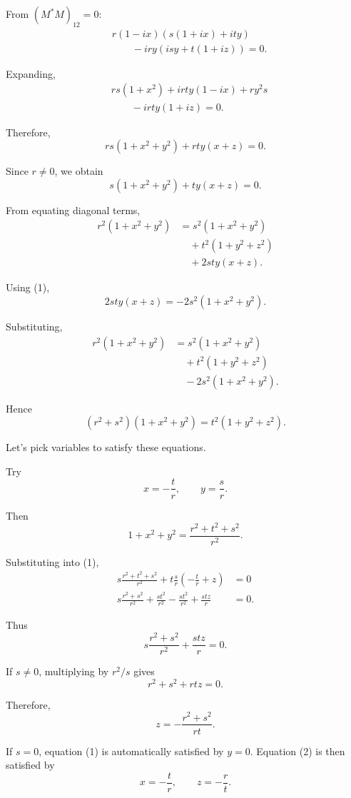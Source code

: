 \documentclass[11pt, reqno, a4paper]{amsart}
\theoremstyle{plain}
\theoremstyle{definition}
\theoremstyle{remark}
\numberwithin{equation}{section}
\begin{document}
From $(M^*M)_{12}=0$:
\begin{align*}
&r(1-ix)(s(1+ix)+ity)\\
&\qquad -iry(isy+t(1+iz))=0.
\end{align*}

Expanding,
\begin{align*}
&rs(1+x^2)+irty(1-ix)+ry^2s\\
&\qquad -irty(1+iz)=0.
\end{align*}

Therefore,
\[
rs(1+x^2+y^2)+rty(x+z)=0.
\]

Since $r\neq0$, we obtain
\[
\boxed{
s(1+x^2+y^2)+ty(x+z)=0.
\tag{1}
}
\]

From equating diagonal terms,
\begin{align*}
r^2(1+x^2+y^2)
&=
s^2(1+x^2+y^2)\\
&\quad+t^2(1+y^2+z^2)\\
&\quad+2sty(x+z).
\end{align*}

Using (1),
\[
2sty(x+z)=-2s^2(1+x^2+y^2).
\]

Substituting,
\begin{align*}
r^2(1+x^2+y^2)
&=
s^2(1+x^2+y^2)\\
&\quad+t^2(1+y^2+z^2)\\
&\quad-2s^2(1+x^2+y^2).
\end{align*}

Hence
\[
\boxed{
(r^2+s^2)(1+x^2+y^2)
=
t^2(1+y^2+z^2).
\tag{2}
}
\]

Let's pick variables to satisfy these equations.

Try
\[
x=-\frac{t}{r},
\qquad
y=\frac{s}{r}.
\]

Then
\[
1+x^2+y^2
=
\frac{r^2+t^2+s^2}{r^2}.
\]

Substituting into (1),
\begin{align*}
s\frac{r^2+t^2+s^2}{r^2}
+
t\frac{s}{r}
\left(-\frac{t}{r}+z\right)
&=0\\
s\frac{r^2+s^2}{r^2}
+
\frac{st^2}{r^2}
-
\frac{st^2}{r^2}
+
\frac{stz}{r}
&=0.
\end{align*}

Thus
\[
s\frac{r^2+s^2}{r^2}
+
\frac{stz}{r}=0.
\]

If $s\neq0$, multiplying by $r^2/s$ gives
\[
r^2+s^2+rtz=0.
\]

Therefore,
\[
\boxed{
z=-\frac{r^2+s^2}{rt}.
}
\]

If $s=0$, equation (1) is automatically satisfied by $y=0$. Equation (2) is then satisfied by
\[
x=-\frac{t}{r},
\qquad
z=-\frac{r}{t}.
\]
\end{document}
